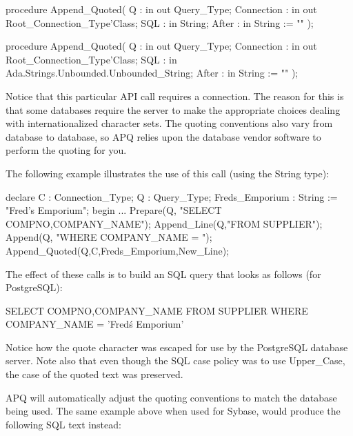 \documentclass[english,letterpaper]{book}
\begin{document}
\begin{Code}
procedure Append_Quoted(
   Q :          in out Query_Type;
   Connection : in out Root_Connection_Type'Class;
   SQL :        in     String;
   After :      in     String := ""
);
\end{Code}

\begin{Code}
procedure Append_Quoted(
   Q :          in out Query_Type;
   Connection : in out Root_Connection_Type'Class;
   SQL :        in     Ada.Strings.Unbounded.Unbounded_String;
   After :      in     String := ""
);
\end{Code}

Notice that this particular API call requires a connection. The reason
for this is that some databases require the server to make the appropriate
choices dealing with internationalized character sets. The quoting
conventions also vary from database to database, so APQ relies upon
the database vendor software to perform the quoting for you.

The following example illustrates the use of this call (using the
String type):

\begin{Example}
declare
   C :               Connection_Type;
   Q :               Query_Type;
   Freds_Emporium :  String := "Fred's Emporium";
begin
   ...
   Prepare(Q,    "SELECT COMPNO,COMPANY_NAME");
   Append_Line(Q,"FROM SUPPLIER");
   Append(Q,     "WHERE COMPANY_NAME = ");
   Append_Quoted(Q,C,Freds_Emporium,New_Line);
\end{Example}

The effect of these calls is to build an SQL query that looks as follows
(for PostgreSQL):

\begin{SQL}
SELECT COMPNO,COMPANY_NAME
FROM SUPPLIER
WHERE COMPANY_NAME = 'Fred\'s Emporium'
\end{SQL}

Notice how the quote character was escaped for use by the PostgreSQL
database server. Note also that even though the SQL case policy was to
use Upper\_Case, the case of the quoted text was preserved.

APQ will automatically adjust the quoting conventions to match the
database being used. The same example above when used for Sybase,
would produce the following SQL text instead:
\end{document}
